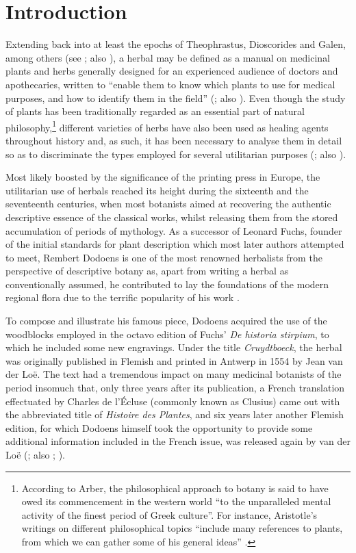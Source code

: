 \documentclass{article}
\begin{document}
\section{Introduction} 
Extending back into at least the epochs of Theophrastus, Dioscorides and
Galen, among others (see \cite[xxxvii-xliii]{hunt_plant_1989}; also \cite{moreno_olalla_lelamour_2018}), a herbal may be defined as a manual on medicinal plants and herbs
generally designed for an experienced audience of doctors and
apothecaries, written to ``enable them to know which plants to use for
medical purposes, and how to identify them in the field'' (\cite[24]{elliott_world_2011}; also \cite{britannica_herbal_2012}). Even though the study of plants has
been traditionally regarded as an essential part of natural
philosophy,\footnote{According to Arber, the philosophical approach to
  botany is said to have owed its commencement in the western world ``to
  the unparalleled mental activity of the finest period of Greek
  culture''. For instance, Aristotle's writings on different
  philosophical topics ``include many references to plants, from which
  we can gather some of his general ideas'' \citep[1--2]{arber_herbals_1953}.} different
varieties of herbs have also been used as healing agents throughout history and, as such, it has been necessary to analyse them in detail so
as to discriminate the types employed for several utilitarian purposes
(\cite[1--6]{arber_herbals_1953}; also \cite[19--21]{neville_early_2022}).

Most likely boosted by the significance of the printing press in Europe,
the utilitarian use of herbals reached its height during the sixteenth
and the seventeenth centuries, when most botanists aimed at recovering
the authentic descriptive essence of the classical works, whilst
releasing them from the stored accumulation of periods of mythology. As
a successor of Leonard Fuchs, founder of the initial standards for plant
description which most later authors attempted to meet, Rembert Dodoens
is one of the most renowned herbalists from the perspective of
descriptive botany as, apart from writing a herbal as conventionally
assumed, he contributed to lay the foundations of the modern regional
flora due to the terrific popularity of his work \citep[24--26]{elliott_world_2011}.

To compose and illustrate his famous piece, Dodoens acquired the use of
the woodblocks employed in the octavo edition of Fuchs' \emph{De
historia stirpium}, to which he included some new engravings. Under the
title \emph{Cruydtboeck}, the herbal was originally published in Flemish
and printed in Antwerp in 1554 by Jean van der Loë. The text had a
tremendous impact on many medicinal botanists of the period insomuch
that, only three years after its publication, a French translation
effectuated by Charles de l'Écluse (commonly known as Clusius) came out
with the abbreviated title of \emph{Histoire des Plantes}, and six years
later another Flemish edition, for which Dodoens himself took the
opportunity to provide some additional information included in the
French issue, was released again by van der Loë (\cite[82]{arber_herbals_1953}; also \cite{barlow_old_1913}; \cite{elliott_world_2011}).
\end{document}
